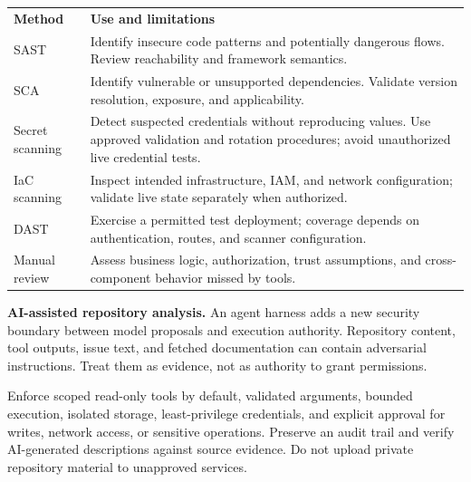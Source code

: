\documentclass[11pt,letterpaper]{article}
\newcommand{\tablehead}[2]{\rowcolor{navy}\color{white}\textbf{#1}&\color{white}\textbf{#2}\\}
\begin{document}
\noindent\begin{tabularx}{\linewidth}{@{}P{1.35in}Y@{}}
\tablehead{Method}{Use and limitations}
SAST & Identify insecure code patterns and potentially dangerous flows. Review reachability and framework semantics.\\
SCA & Identify vulnerable or unsupported dependencies. Validate version resolution, exposure, and applicability.\\
Secret scanning & Detect suspected credentials without reproducing values. Use approved validation and rotation procedures; avoid unauthorized live credential tests.\\
IaC scanning & Inspect intended infrastructure, IAM, and network configuration; validate live state separately when authorized.\\
DAST & Exercise a permitted test deployment; coverage depends on authentication, routes, and scanner configuration.\\
Manual review & Assess business logic, authorization, trust assumptions, and cross-component behavior missed by tools.\\
\bottomrule
\end{tabularx}
\textbf{AI-assisted repository analysis.} An agent harness adds a new security boundary between model proposals and execution authority. Repository content, tool outputs, issue text, and fetched documentation can contain adversarial instructions. Treat them as evidence, not as authority to grant permissions.
\begin{center}
\end{center}
Enforce scoped read-only tools by default, validated arguments, bounded execution, isolated storage, least-privilege credentials, and explicit approval for writes, network access, or sensitive operations. Preserve an audit trail and verify AI-generated descriptions against source evidence. Do not upload private repository material to unapproved services.
\end{document}
